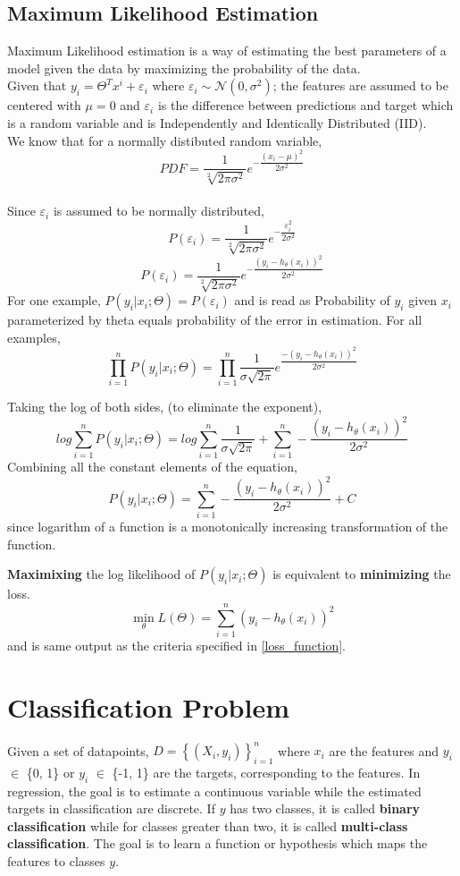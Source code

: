 \documentclass[12pt,a4paper,titlepage,portrait,openany]{book}
\begin{document}
	\subsection{Maximum Likelihood Estimation}
	Maximum Likelihood estimation is a way of estimating the best parameters of a model given the data by maximizing the probability of the data.\\
	Given that $y_i = \Theta^Tx^i + \varepsilon_i$
	where $\varepsilon_i \sim \mathcal{N}(0, \sigma^2)$; the features are assumed to be centered with $\mu = 0$ and $\varepsilon_i$ is the difference between predictions and target which is a random variable and is Independently and Identically Distributed (IID). \\
	We know that for a normally distibuted random variable, $$PDF = \dfrac{1}{\sqrt[2]{2\pi\sigma^2}}e^{-\dfrac{(x_i-\mu)^2}{2\sigma^2}}$$ \\
	Since $\varepsilon_i$ is assumed to be normally distributed, 
	$$P(\varepsilon_i) = \dfrac{1}{\sqrt[2]{2\pi\sigma^2}}e^{-\dfrac{\varepsilon_i^2}{2\sigma^2}}$$
	$$P(\varepsilon_i) = \dfrac{1}{\sqrt[2]{2\pi\sigma^2}}e^{-\dfrac{(y_i - h_\theta(x_i))^2}{2\sigma^2}}$$
	For one example, $P(y_i | x_i;\Theta) = P(\varepsilon_i)$ and is read as Probability of $y_i$ given $x_i$ parameterized by theta equals probability of the error in estimation. For all examples,
	$$\prod_{i=1}^{n}P(y_i | x_i; \Theta) = \prod_{i=1}^{n}\dfrac{1}{\sigma\sqrt{2\pi}}e^{\dfrac{-(y_i - h_\theta(x_i))^2}{2\sigma^2}}$$
	
	Taking the log of both sides, (to eliminate the exponent),
	$$log \sum_{i=1}^{n}P(y_i | x_i;\Theta) = log \sum_{i=1}^{n}\dfrac{1}{\sigma\sqrt{2\pi}} + \sum_{i=1}^{n}-\dfrac{(y_i - h_\theta(x_i))^2}{2\sigma^2}$$
	Combining all the constant elements of the equation,
	$$P(y_i | x_i;\Theta) = \sum_{i=1}^{n}-\dfrac{(y_i - h_\theta(x_i))^2}{2\sigma^2} + C$$ since logarithm of a function is a monotonically increasing transformation of the function. 
	
	\textbf{Maximixing} the log likelihood of $P(y_i | x_i; \Theta)$ is equivalent to \textbf{minimizing} the loss.
	$$\min\limits_\theta{L(\Theta) }= \sum_{i=1}^{n}(y_i - h_\theta(x_i))^2$$ and is same output as the criteria specified in \eqref{loss_function}.
	
	\section{Classification Problem}
	Given a set of datapoints, $ D = \left\{\left(X_i, y_i\right)\right\}_{i=1}^n $ where $x_i$ are the features and $y_i$ $\in$ \{0, 1\} or $y_i$ $\in$ \{-1, 1\}  are the targets, corresponding to the features. In regression, the goal is to estimate a continuous variable while the estimated targets in classification are discrete. If $y$ has two classes, it is called \textbf{binary classification} while for classes greater than two, it is called \textbf{multi-class classification}.   The goal is to learn  a function or hypothesis which maps the features to classes $y$. \\
	 
\end{document}
